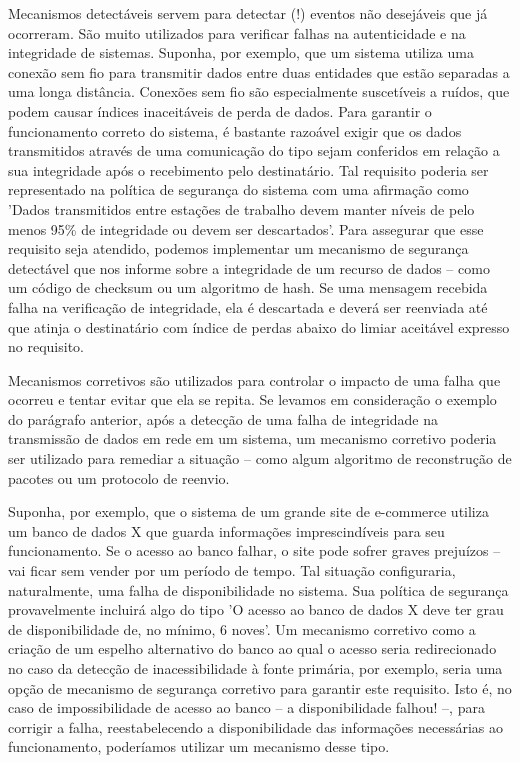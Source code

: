 \documentclass[
	10pt,				%
	openright,			%
	twoside,			%
	a5paper,			%
	english,			%
	french,				%
	spanish,			%
	brazil,				%
	sumario=tradicional
]{abntex2}
\begin{document}
Mecanismos detectáveis servem para detectar (!) eventos não desejáveis que já ocorreram. São muito utilizados para verificar falhas na autenticidade e na integridade de sistemas. Suponha, por exemplo, que um sistema utiliza uma conexão sem fio para transmitir dados entre duas entidades que estão separadas a uma longa distância. Conexões sem fio são especialmente suscetíveis a ruídos, que podem causar índices inaceitáveis de perda de dados. Para garantir o funcionamento correto do sistema, é bastante razoável exigir que os dados transmitidos através de uma comunicação do tipo sejam conferidos em relação a sua integridade após o recebimento pelo destinatário. Tal requisito poderia ser representado na política de segurança do sistema com uma afirmação como 'Dados transmitidos entre estações de trabalho devem manter níveis de pelo menos 95\% de integridade ou devem ser descartados'. Para assegurar que esse requisito seja atendido, podemos implementar um mecanismo de segurança detectável que nos informe sobre a integridade de um recurso de dados – como um código de checksum ou um algoritmo de hash. Se uma mensagem recebida falha na verificação de integridade, ela é descartada e deverá ser reenviada até que atinja o destinatário com índice de perdas abaixo do limiar aceitável expresso no requisito.

Mecanismos corretivos são utilizados para controlar o impacto de uma falha que ocorreu e tentar evitar que ela se repita. Se levamos em consideração o exemplo do parágrafo anterior, após a detecção de uma falha de integridade na transmissão de dados em rede em um sistema, um mecanismo corretivo poderia ser utilizado para remediar a situação – como algum algoritmo de reconstrução de pacotes ou um protocolo de reenvio.

Suponha, por exemplo, que o sistema de um grande site de e-commerce utiliza um banco de dados X que guarda informações imprescindíveis para seu funcionamento. Se o acesso ao banco falhar, o site pode sofrer graves prejuízos – vai ficar sem vender por um período de tempo. Tal situação configuraria, naturalmente, uma falha de disponibilidade no sistema. Sua política de segurança provavelmente incluirá algo do tipo 'O acesso ao banco de dados X deve ter grau de disponibilidade de, no mínimo, 6 noves'. Um mecanismo corretivo como a criação de um espelho alternativo do banco ao qual o acesso seria redirecionado no caso da detecção de inacessibilidade à fonte primária, por exemplo, seria uma opção de mecanismo de segurança corretivo para garantir este requisito. Isto é, no caso de impossibilidade de acesso ao banco – a disponibilidade falhou! –, para corrigir a falha, reestabelecendo a disponibilidade das informações necessárias ao funcionamento, poderíamos utilizar um mecanismo desse tipo.
\end{document}
